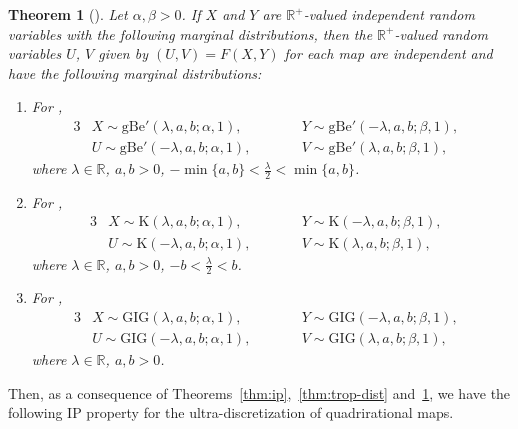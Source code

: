 \documentclass[pdftex]{sigma}
\numberwithin{equation}{section}
\newtheorem{Theorem}{Theorem}[section]
\def\R{\mathbb{R}}
\newcommand{\la}{\lambda}
\def\a{{\alpha}}
\def\b{{\beta}}
\begin{document}
\begin{Theorem}[{\cite[Theorem 1.1]{SU}}] \label{thm:ip-quad-su}
Let $\a, \b >0$. If $X$ and $Y$ are $\R^+$-valued independent random variables with the following marginal distributions, then the $\R^+$-valued random variables $U$, $V$ given by $(U,V)=F(X,Y)$ for each map are independent and have the following marginal distributions:
\begin{enumerate}\itemsep=0pt
\item[$(i)$] For \smash{$F= H^{+,\a,\b}_{\mathrm{I}}$},
\begin{alignat*}{3}
&X \sim \mathrm{gBe}' (\la, a, b; \a, 1),\qquad && Y \sim \mathrm{gBe}' (-\la, a, b; \b, 1),& \\
&U \sim \mathrm{gBe}' (-\la, a, b; \a, 1),\qquad && V \sim \mathrm{gBe}' (\la, a, b; \b, 1),&
\end{alignat*}
where $\lambda \in \R$, $a,b >0$, $- \min\{a,b\} < \frac{\lambda}{2} < \min\{a,b\}$.

\item[$(ii)$] For \smash{$F= H^{+,\a,\b}_{\mathrm{II}}$},
\begin{alignat*}{3}
&X \sim \mathrm{K} (\la, a, b; \a, 1), \qquad && Y \sim \mathrm{K} (-\la, a, b; \b, 1),& \\
&U \sim \mathrm{K} (-\la, a, b; \a, 1), \qquad && V \sim \mathrm{K} (\la, a, b; \b, 1),&
\end{alignat*}
where $\lambda \in \R$, $a,b >0$, $-b < \frac{\lambda}{2} < b$.

\item[$(iii)$] For \smash{$F= H^{A,\a,\b}_{\mathrm{III}}$},
\begin{alignat*}{3}
&X \sim \mathrm{GIG} (\la, a, b; \a, 1), \qquad && Y \sim \mathrm{GIG} (-\la, a, b; \b, 1),& \\
&U \sim \mathrm{GIG}(-\la, a, b; \a, 1), \qquad && V \sim \mathrm{GIG} (\la, a, b; \b, 1),&
\end{alignat*}
where $\lambda \in \R$, $a,b >0$.
\end{enumerate}
\end{Theorem}

Then, as a consequence of Theorems~\ref{thm:ip},~\ref{thm:trop-dist} and~\ref{thm:ip-quad-su}, we have the following IP property for the ultra-discretization of quadrirational maps.
\end{document}
